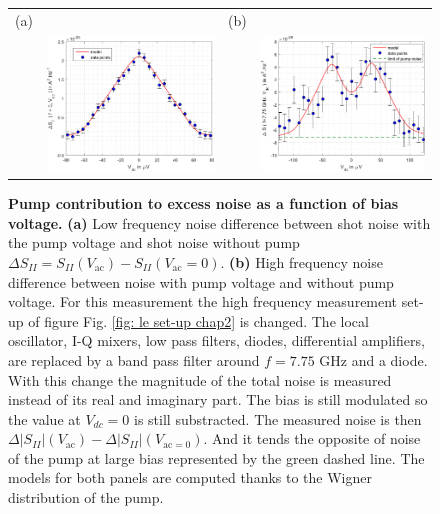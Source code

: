 \begin{figure}[hptb]
	\begin{center}
		\begin{tabular}{c c c c}
			(a) & & (b) & \\
			& \includegraphics[width = 6.5 cm]{./chap3/LF_noise_pump_vs_V_dc} &
			& \includegraphics[width = 6.5 cm]{./chap3/RF_noise_pump_vs_V_dc}
		\end{tabular}
	\end{center}
	
	\caption{\textbf{Pump contribution to excess noise as a function of bias voltage.} \textbf{(a)} Low frequency noise difference between shot noise with the pump voltage and shot noise without pump $\Delta S_{II} = S_{II}\left(V_{\mathrm{ac}}\right) - S_{II}\left(V_{\mathrm{ac}}=0\right)$. \textbf{(b)} High frequency noise difference between noise with pump voltage and without pump voltage. For this measurement the high frequency measurement set-up of figure Fig. \ref{fig: le set-up chap2} is changed. The local oscillator, I-Q mixers, low pass filters, diodes, differential amplifiers, are replaced by a band pass filter around $f = 7.75$ GHz and a diode. With this change the magnitude of the total noise is measured instead of its real and imaginary part. The bias is still modulated so the value at $V_{dc} = 0$ is still substracted. The measured noise is then $\Delta\left|S_{II}\right|\left(V_{\mathrm{ac}}\right)-\Delta\left|S_{II}\right|\left(V_{\mathrm{ac} = 0}\right)$. And it tends the opposite of noise of the pump at large bias represented by the green dashed line. The models for both panels are computed thanks to the Wigner distribution of the pump.}
	\label{fig: noise pump vs Vdc}
\end{figure}

